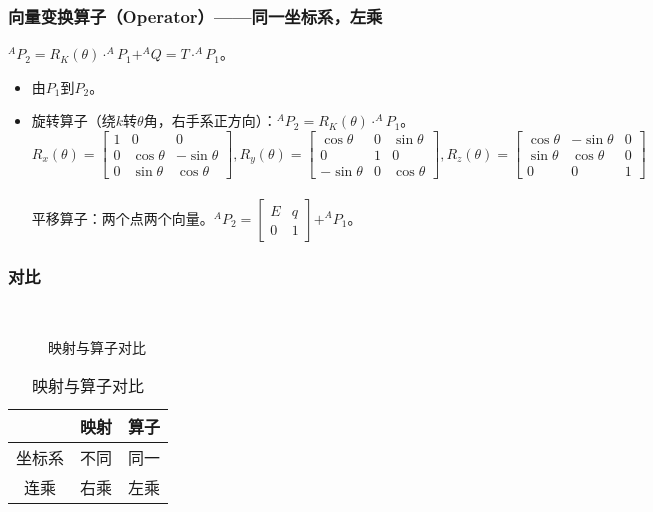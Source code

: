 \documentclass[
12pt, %
a4paper, 
oneside, %
headinclude,footinclude, %
]{scrartcl}
\begin{document}
\subsubsection{向量变换算子（Operator）——同一坐标系，左乘}
$ ^A P_2 = R_K(\theta) \cdot ^A P_1 + ^A Q= T \cdot ^A P_1 $。
\begin{itemize}
\item 由$ P_1 $到$ P_2 $。
\item 旋转算子（绕$ k $转$ \theta $角，右手系正方向）：$ ^A P_2 = R_K(\theta) \cdot ^AP_1 $。 \\
$$
R_x(\theta) = \begin{bmatrix} 1 & 0 & 0 \\ 0 & \cos\theta & -\sin\theta \\ 0 & \sin\theta & \cos\theta \end{bmatrix}, 
R_y(\theta) = \begin{bmatrix} \cos\theta & 0 & \sin\theta \\ 0 & 1 & 0 \\ -\sin\theta & 0 & \cos\theta \end{bmatrix}, 
R_z(\theta) = \begin{bmatrix} \cos\theta & -\sin\theta & 0 \\ \sin\theta & \cos\theta & 0 \\ 0 & 0 & 1 \end{bmatrix}
$$ \\
平移算子：两个点两个向量。$ ^A P_2 = \begin{bmatrix} E & q \\ 0 & 1 \end{bmatrix} + ^A P_1 $。
\end{itemize}
\subsubsection{对比}
\begin{figure}[H]
\centering
{} \quad
{} \\
 \quad
{}
\caption[映射与算子对比]{映射与算子对比}
\end{figure}

\begin{table}[hbt]
\caption{映射与算子对比}
\centering
\begin{tabular}{c|cc}
\hline
& 映射 & 算子 \\
\hline
坐标系 & 不同 & 同一 \\
连乘 & 右乘 & 左乘 \\
\hline
\end{tabular}
\end{table}
\end{document}
